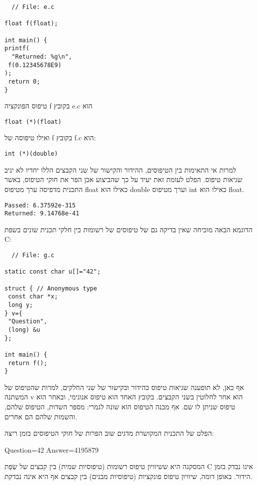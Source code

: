 \begin{verbatim}
  // File: e.c

float f(float);

int main() {
printf(
  "Returned: %g\n",
 f(0.12345678E9)
);
 return 0;
}

\end{verbatim}

      טיפוס הפונקציה f בקובץ e.c הוא

\begin{verbatim}
float (*)(float)
\end{verbatim}

      ואילו טיפוסה של f בקובץ f.c הוא:
\begin{verbatim}
int (*)(double)
\end{verbatim}

      למרות אי התאימות בין הטיפוסים, ההידור והקישור של שני הקבצים הללו יחדיו לא יניב
      שגיאות טיפוס. הפלט לעומת זאת יעיד על כך שהביצוע אכן הפר את חוקי הטיפוס, באשר
      התכנית מדפיסה ערך מטיפוס float כאילו הוא double וערך מטיפוס int כאילו הוא
      float.

\begin{verbatim}
Passed: 6.37592e-315
Returned: 9.14768e-41
\end{verbatim}

      הדוגמא הבאה מוכיחה שאין בדיקה גם של טיפוסים של רשומות בין חלקי תכנית שונים בשפת C:

\begin{verbatim}
  // File: g.c

static const char u[]="42";

struct { // Anonymous type
 const char *x;
 long y;
} v={
 "Question",
 (long) &u
};

int main() {
 return f();
}
\end{verbatim}

      אף כאן, לא תופענה שגיאות טיפוס בהידור ובקישור של שני החלקים, למרות שהטיפוס של המשתנה v הוא אחר לחלוטין בשני הקבצים. בקובץ האחד הוא טיפוס אנונימי, ובאחר הוא טיפוס שניתן לו שם. אף מבנה הטיפוס הוא שונה לגמרי: מספר השדות, הטיפוס שלהם, והשמות שלהם הם אחרים.

      הפלט של התכנית המקושרת מדגים שוב הפרות של חוקי הטיפוסים בזמן ריצה:

      Question=42
      Answer=4195879

      המסקנה היא ששיוויון טיפוס רשומות (טיפוסיות שמית) בין קבצים של שְׂפַת C אינו נבדק בזמן הידור. באופן דומה, שיוויון טיפוס פונקציות (טיפוסיות מבנים) בין קבצים אף היא אינה נבדקת.

